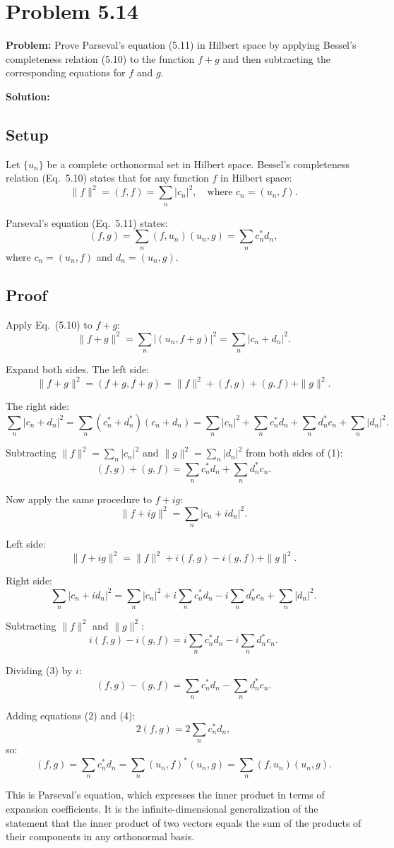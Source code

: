 \documentclass[12pt]{article}
\begin{document}
\section*{Problem 5.14}

\textbf{Problem:} Prove Parseval's equation (5.11) in Hilbert space by applying Bessel's completeness relation (5.10) to the function $f + g$ and then subtracting the corresponding equations for $f$ and $g$.

\bigskip
\textbf{Solution:}

\subsection*{Setup}

Let $\{u_n\}$ be a complete orthonormal set in Hilbert space. Bessel's completeness relation (Eq.\ 5.10) states that for any function $f$ in Hilbert space:
\[
\|f\|^2 = (f, f) = \sum_n |c_n|^2, \quad \text{where } c_n = (u_n, f). \tag{5.10}
\]

Parseval's equation (Eq.\ 5.11) states:
\[
(f, g) = \sum_n (f, u_n)(u_n, g) = \sum_n c_n^* d_n, \tag{5.11}
\]
where $c_n = (u_n, f)$ and $d_n = (u_n, g)$.

\subsection*{Proof}

Apply Eq.\ (5.10) to $f + g$:
\[
\|f + g\|^2 = \sum_n |(u_n, f+g)|^2 = \sum_n |c_n + d_n|^2. \tag{1}
\]

Expand both sides. The left side:
\[
\|f+g\|^2 = (f+g, f+g) = \|f\|^2 + (f,g) + (g,f) + \|g\|^2.
\]

The right side:
\[
\sum_n |c_n + d_n|^2 = \sum_n (c_n^* + d_n^*)(c_n + d_n) = \sum_n |c_n|^2 + \sum_n c_n^* d_n + \sum_n d_n^* c_n + \sum_n |d_n|^2.
\]

Subtracting $\|f\|^2 = \sum_n |c_n|^2$ and $\|g\|^2 = \sum_n |d_n|^2$ from both sides of (1):
\[
(f,g) + (g,f) = \sum_n c_n^* d_n + \sum_n d_n^* c_n. \tag{2}
\]

Now apply the same procedure to $f + ig$:
\[
\|f + ig\|^2 = \sum_n |c_n + id_n|^2.
\]

Left side:
\[
\|f+ig\|^2 = \|f\|^2 + i(f,g) - i(g,f) + \|g\|^2.
\]

Right side:
\[
\sum_n |c_n + id_n|^2 = \sum_n |c_n|^2 + i\sum_n c_n^* d_n - i\sum_n d_n^* c_n + \sum_n |d_n|^2.
\]

Subtracting $\|f\|^2$ and $\|g\|^2$:
\[
i(f,g) - i(g,f) = i\sum_n c_n^* d_n - i\sum_n d_n^* c_n. \tag{3}
\]

Dividing (3) by $i$:
\[
(f,g) - (g,f) = \sum_n c_n^* d_n - \sum_n d_n^* c_n. \tag{4}
\]

Adding equations (2) and (4):
\[
2(f,g) = 2\sum_n c_n^* d_n,
\]
so:
\[
\boxed{(f,g) = \sum_n c_n^* d_n = \sum_n (u_n,f)^*(u_n,g) = \sum_n (f,u_n)(u_n,g).}
\]

This is Parseval's equation, which expresses the inner product in terms of expansion coefficients. It is the infinite-dimensional generalization of the statement that the inner product of two vectors equals the sum of the products of their components in any orthonormal basis.
\end{document}

